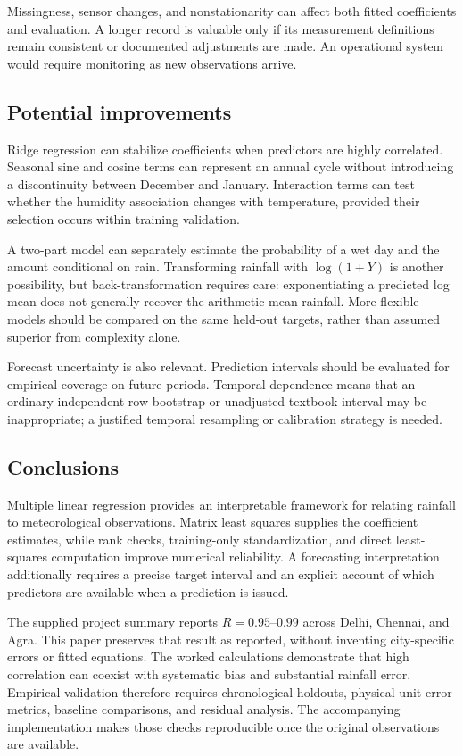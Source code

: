 \documentclass[11pt,a4paper]{article}
\begin{document}
Missingness, sensor changes, and nonstationarity can affect both fitted coefficients and evaluation. A longer record is valuable only if its measurement definitions remain consistent or documented adjustments are made. An operational system would require monitoring as new observations arrive.

\subsection{Potential improvements}
Ridge regression can stabilize coefficients when predictors are highly correlated. Seasonal sine and cosine terms can represent an annual cycle without introducing a discontinuity between December and January. Interaction terms can test whether the humidity association changes with temperature, provided their selection occurs within training validation.

A two-part model can separately estimate the probability of a wet day and the amount conditional on rain. Transforming rainfall with $\log(1+Y)$ is another possibility, but back-transformation requires care: exponentiating a predicted log mean does not generally recover the arithmetic mean rainfall. More flexible models should be compared on the same held-out targets, rather than assumed superior from complexity alone.

Forecast uncertainty is also relevant. Prediction intervals should be evaluated for empirical coverage on future periods. Temporal dependence means that an ordinary independent-row bootstrap or unadjusted textbook interval may be inappropriate; a justified temporal resampling or calibration strategy is needed.

\subsection{Conclusions}
Multiple linear regression provides an interpretable framework for relating rainfall to meteorological observations. Matrix least squares supplies the coefficient estimates, while rank checks, training-only standardization, and direct least-squares computation improve numerical reliability. A forecasting interpretation additionally requires a precise target interval and an explicit account of which predictors are available when a prediction is issued.

The supplied project summary reports $R=0.95$--$0.99$ across Delhi, Chennai, and Agra. This paper preserves that result as reported, without inventing city-specific errors or fitted equations. The worked calculations demonstrate that high correlation can coexist with systematic bias and substantial rainfall error. Empirical validation therefore requires chronological holdouts, physical-unit error metrics, baseline comparisons, and residual analysis. The accompanying implementation makes those checks reproducible once the original observations are available.
\end{document}
